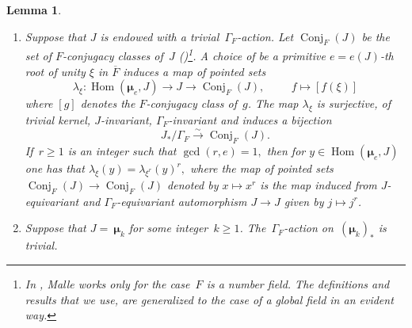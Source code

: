 \documentclass[a4paper,english,12pt]{amsart}
\newcommand{\muu}{\boldsymbol{\mu}}
\DeclareMathOperator{\Conj}{Conj}
\DeclareMathOperator{\Hom}{Hom}
\newtheorem{lem}[equation]{Lemma}
\numberwithin{equation}{subsection}
\begin{document}
\begin{lem}\label{slabalema}
\begin{enumerate}
\item Suppose that $J$ is endowed with a trivial~$\Gamma_F$-action.  Let $\Conj_F(J)$ be the set of $F$-conjugacy classes of~$J$ (\cite[Section 2]{Malle})\footnote{In \cite{Malle}, Malle works only for the case~$F$ is a number field. The definitions and results that we use, are generalized to the case of a global field in an evident way.}. A choice of be a primitive $e=e(J)$-th root of unity $\xi$ in $\overline F$ induces a map of pointed sets $$\lambda_{\xi}:\Hom(\muu_e, J)\to J\to\Conj_F(J),\hspace{1cm} f\mapsto [f(\xi)]$$ where $[g]$ denotes the $F$-conjugacy class of~$g$. The map $\lambda_{\xi}$ is surjective, of trivial kernel, $J$-invariant, $\Gamma_F$-invariant and induces a bijection $$J_*/\Gamma_F\xrightarrow{\sim}\Conj_F(J).$$ If~$r\geq 1$ is an integer such that $\gcd(r,e)=1,$ then for $y\in \Hom(\muu_e, J)$ one has that $\lambda_{\xi}(y)=\lambda_{\xi^r}(y)^r,$ where the map of pointed sets $\Conj_F(J)\to\Conj_F(J)$ denoted by $x\mapsto x^r$ is the map induced from $J$-equivariant and $\Gamma_F$-equivariant automorphism $J\to J$ given by $j\mapsto j^r$.  %
\item Suppose that $J=~\muu_k$ for some integer~$k\geq 1$. The~$\Gamma_F$-action on~$(\muu_k)_*$ is trivial.
\end{enumerate}
\end{lem}
\end{document}
